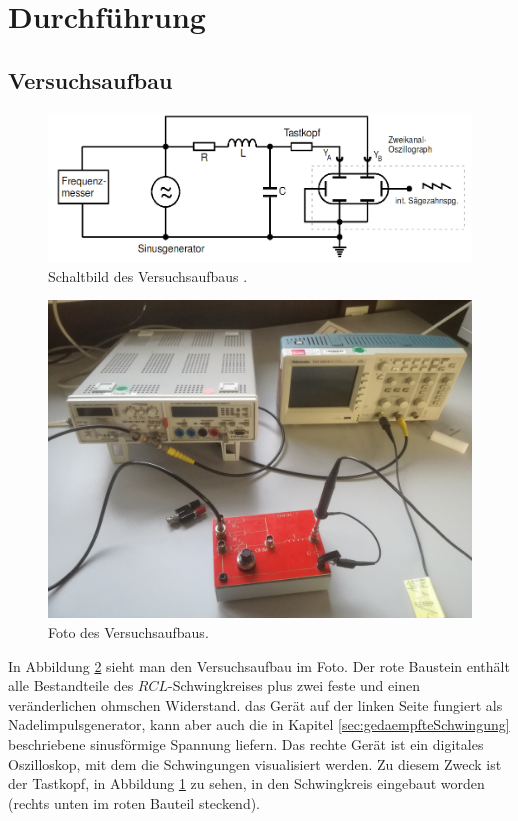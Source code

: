\section{Durchführung}
\subsection{Versuchsaufbau}
\begin{figure}
  \centering
  \includegraphics[scale=0.3]{aufbau.png}
  \caption{Schaltbild des Versuchsaufbaus \cite{anleitung}.}
  \label{fig:3}
\end{figure}
\begin{figure}
  \centering
  \includegraphics[scale=0.05]{foto.jpg}
  \caption{Foto des Versuchsaufbaus.}
  \label{fig:4}
\end{figure}
In Abbildung \ref{fig:4} sieht man den Versuchsaufbau im Foto. Der rote Baustein enthält
alle Bestandteile des $RCL$-Schwingkreises plus zwei feste und einen veränderlichen
ohmschen Widerstand. das Gerät auf der linken Seite fungiert als Nadelimpulsgenerator,
kann aber auch die in Kapitel \ref{sec:gedaempfteSchwingung} beschriebene sinusförmige
Spannung liefern. Das rechte Gerät ist ein digitales Oszilloskop, mit dem die Schwingungen
visualisiert werden. Zu diesem Zweck ist der Tastkopf, in Abbildung \ref{fig:3} zu sehen,
in den Schwingkreis eingebaut worden (rechts unten im roten Bauteil steckend).


